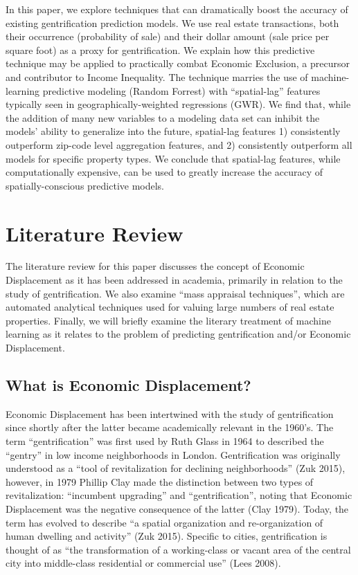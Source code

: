 \documentclass[12pt,]{article}
\begin{document}
In this paper, we explore techniques that can dramatically boost the
accuracy of existing gentrification prediction models. We use real
estate transactions, both their occurrence (probability of sale) and
their dollar amount (sale price per square foot) as a proxy for
gentrification. We explain how this predictive technique may be applied
to practically combat Economic Exclusion, a precursor and contributor to
Income Inequality. The technique marries the use of machine-learning
predictive modeling (Random Forrest) with ``spatial-lag'' features
typically seen in geographically-weighted regressions (GWR). We find
that, while the addition of many new variables to a modeling data set
can inhibit the models' ability to generalize into the future,
spatial-lag features 1) consistently outperform zip-code level
aggregation features, and 2) consistently outperform all models for
specific property types. We conclude that spatial-lag features, while
computationally expensive, can be used to greatly increase the accuracy
of spatially-conscious predictive models.

\hypertarget{literature-review}{%
\section{Literature Review}\label{literature-review}}

The literature review for this paper discusses the concept of Economic
Displacement as it has been addressed in academia, primarily in relation
to the study of gentrification. We also examine ``mass appraisal
techniques'', which are automated analytical techniques used for valuing
large numbers of real estate properties. Finally, we will briefly
examine the literary treatment of machine learning as it relates to the
problem of predicting gentrification and/or Economic Displacement.

\hypertarget{what-is-economic-displacement}{%
\subsection{What is Economic
Displacement?}\label{what-is-economic-displacement}}

Economic Displacement has been intertwined with the study of
gentrification since shortly after the latter became academically
relevant in the 1960's. The term ``gentrification'' was first used by
Ruth Glass in 1964 to described the ``gentry'' in low income
neighborhoods in London. Gentrification was originally understood as a
``tool of revitalization for declining neighborhoods'' (Zuk 2015),
however, in 1979 Phillip Clay made the distinction between two types of
revitalization: ``incumbent upgrading'' and ``gentrification'', noting
that Economic Displacement was the negative consequence of the latter
(Clay 1979). Today, the term has evolved to describe ``a spatial
organization and re-organization of human dwelling and activity'' (Zuk
2015). Specific to cities, gentrification is thought of as ``the
transformation of a working-class or vacant area of the central city
into middle-class residential or commercial use'' (Lees 2008).
\end{document}
